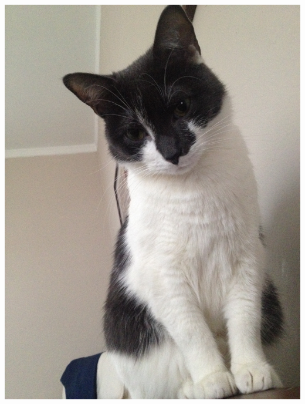 \documentclass{beamer}
\begin{document}
\begin{frame}
\begin{columns}
\begin{column}{0.5\textwidth}
      \begin{center}
        \includegraphics[height = 0.4\textheight, keepaspectratio = true]{figure/annyong}
      \end{center}
    \end{column}
  \end{columns}
\end{frame}
\end{document}
